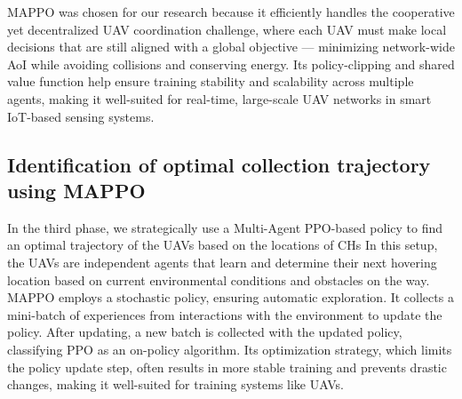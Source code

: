 \documentclass[conference]{IEEEtran}
\begin{document}
MAPPO was chosen for our research because it efficiently handles the cooperative yet decentralized UAV coordination challenge, where each UAV must make local decisions that are still aligned with a global objective — minimizing network-wide AoI while avoiding collisions and conserving energy. Its policy-clipping and shared value function help ensure training stability and scalability across multiple agents, making it well-suited for real-time, large-scale UAV networks in smart IoT-based sensing systems.
\subsection{Identification of optimal collection trajectory using MAPPO}
In the third phase, we strategically use a Multi-Agent PPO-based policy \cite{schulman2017proximal} to find an optimal trajectory of the UAVs based on the locations of CHs
In this setup, the UAVs are independent agents that learn and determine their next hovering location based on current environmental conditions and obstacles on the way. MAPPO employs a stochastic policy, ensuring automatic exploration. It collects a mini-batch of experiences from interactions with the environment to update the policy. After updating, a new batch is collected with the updated policy, classifying PPO as an on-policy algorithm. Its optimization strategy, which limits the policy update step, often results in more stable training and prevents drastic changes, making it well-suited for training systems like UAVs.
\end{document}
